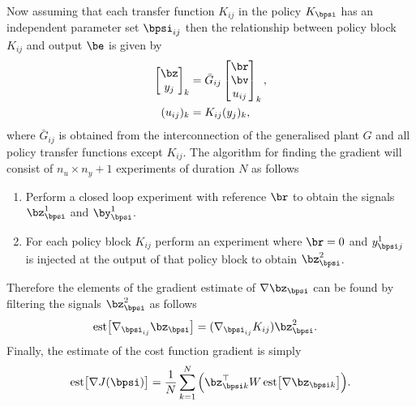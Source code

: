 Now assuming that each transfer function $K_{ij}$ in the policy $K_{\bpsi}$ has an independent parameter set $\bpsi_{ij}$ then the relationship between policy block $K_{ij}$ and output $\be$ is given by
\begin{align}
\begin{bmatrix} \bz \\ y_{j} \end{bmatrix}_k &= \bar G_{ij} \begin{bmatrix} \br \\ \bv \\ u_{ij} \end{bmatrix}_k, \\
(u_{ij})_k &= K_{ij} (y_j)_k,
\end{align}
where $\bar G_{ij}$ is obtained from the interconnection of the generalised plant $G$ and all policy transfer functions except $K_{ij}$. The algorithm for finding the gradient will consist of $n_u \times n_y + 1$ experiments of duration $N$ as follows
\begin{enumerate}[	(1)]
\item Perform a closed loop experiment with reference $\br$ to obtain the signals $\bz_{\bpsi}^1$ and $\by_{\bpsi}^1$.
\item For each policy block $K_{ij}$ perform an experiment where $\br=0$ and $y_{\bpsi j}^1$ is injected at the output of that policy block to obtain $\bz_{\bpsi}^2$.
\end{enumerate}
Therefore the elements of the gradient estimate of $\nabla  \bz_{\bpsi}$ can be found by filtering the signals $\bz_{\bpsi}^2$ as follows
\begin{align}
\mathrm{est} \big[ \nabla_{\bpsi_{ij}} \bz_{\bpsi} \big] &= (\nabla_{\bpsi_{ij}}K_{ij}) \bz_{\bpsi}^2.
\end{align}
Finally, the estimate of the cost function gradient is simply
\begin{equation}
\mathrm{est} \big[\nabla  J(\bpsi) \big] =\frac{1}{N} \sum_{k=1}^N\Big( 
\bz_{\bpsi k}^\top W \,\mathrm{est} \big[ \nabla  \bz_{\bpsi k} \big] 
\Big).
\end{equation}













